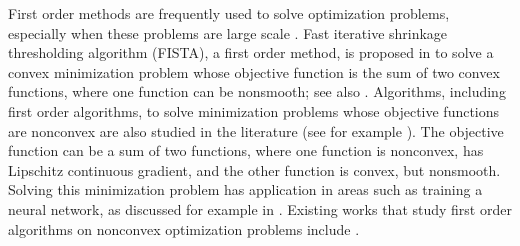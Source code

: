 \documentclass[11pt]{article}
\begin{document}
First order methods are frequently used to solve optimization problems, especially when these problems are large scale \cite{Beck2}.  Fast iterative shrinkage thresholding algorithm (FISTA), a first order method, is proposed in \cite{Beck} to solve a convex minimization problem whose objective function is the sum of two convex functions, where one function can be nonsmooth; see also \cite{Nesterov4, Nesterov6, Nesterov5}.   Algorithms, including first order algorithms,  to solve minimization problems whose objective functions are nonconvex are also studied in the literature (see for example \cite{Cartis}).  The objective function can be a sum of two functions, where one function is nonconvex, has Lipschitz continuous gradient, and the other function is convex, but nonsmooth.  Solving this minimization problem has application in areas such as training a neural network, as discussed for example in  \cite{Goodfellow}.   Existing works that study first order algorithms on nonconvex optimization problems include \cite{Carmon2,Ghadimi,Ghadimi2,Kong,Li,Li2,Liang,Liang2,Liang3,Yao2}.  

\vspace{10pt}
\end{document}

